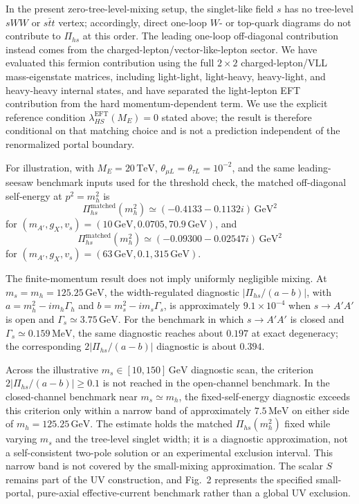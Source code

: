 \documentclass[12pt,a4paper]{article}
\begin{document}
In the present zero-tree-level-mixing setup, the singlet-like field \(s\) has no tree-level \(sWW\) or \(s\bar t t\) vertex; accordingly, direct one-loop \(W\)- or top-quark diagrams do not contribute to \(\Pi_{hs}\) at this order. The leading one-loop off-diagonal contribution instead comes from the charged-lepton/vector-like-lepton sector. We have evaluated this fermion contribution using the full \(2\times2\) charged-lepton/VLL mass-eigenstate matrices, including light-light, light-heavy, heavy-light, and heavy-heavy internal states, and have separated the light-lepton EFT contribution from the hard momentum-dependent term. We use the explicit reference condition \(\lambda_{HS}^{\mathrm{EFT}}(M_E)=0\) stated above; the result is therefore conditional on that matching choice and is not a prediction independent of the renormalized portal boundary.

For illustration, with \(M_E=20\,\mathrm{TeV}\), \(\theta_{\mu L}=\theta_{\tau L}=10^{-2}\), and the same leading-seesaw benchmark inputs used for the threshold check, the matched off-diagonal self-energy at \(p^2=m_h^2\) is
\[
\Pi_{hs}^{\mathrm{matched}}(m_h^2)
\simeq(-0.4133-0.1132i)\,\mathrm{GeV}^2
\]
for \((m_{A'},g_X,v_s)=(10\,\mathrm{GeV},0.0705,70.9\,\mathrm{GeV})\), and
\[
\Pi_{hs}^{\mathrm{matched}}(m_h^2)
\simeq(-0.09300-0.02547i)\,\mathrm{GeV}^2
\]
for \((m_{A'},g_X,v_s)=(63\,\mathrm{GeV},0.1,315\,\mathrm{GeV})\). 

The finite-momentum result does not imply uniformly negligible mixing. At \(m_s=m_h=125.25\,\mathrm{GeV}\), the width-regulated diagnostic \(|\Pi_{hs}/(a-b)|\), with \(a=m_h^2-i m_h\Gamma_h\) and \(b=m_s^2-i m_s\Gamma_s\), is approximately \(9.1\times10^{-4}\) when \(s\to A'A'\) is open and \(\Gamma_s\simeq3.75\,\mathrm{GeV}\). For the benchmark in which \(s\to A'A'\) is closed and \(\Gamma_s\simeq0.159\,\mathrm{MeV}\), the same diagnostic reaches about \(0.197\) at exact degeneracy; the corresponding \(2|\Pi_{hs}/(a-b)|\) diagnostic is about \(0.394\). 

Across the illustrative \(m_s\in[10,150]\,\mathrm{GeV}\) diagnostic scan, the criterion \(2|\Pi_{hs}/(a-b)|\geq0.1\) is not reached in the open-channel benchmark. In the closed-channel benchmark near \(m_s\simeq m_h\), the fixed-self-energy diagnostic exceeds this criterion only within a narrow band of approximately \(7.5\,\mathrm{MeV}\) on either side of \(m_h=125.25\,\mathrm{GeV}\). The estimate holds the matched \(\Pi_{hs}(m_h^2)\) fixed while varying \(m_s\) and the tree-level singlet width; it is a diagnostic approximation, not a self-consistent two-pole solution or an experimental exclusion interval. This narrow band is not covered by the small-mixing approximation. The scalar \(S\) remains part of the UV construction, and Fig.~2 represents the specified small-portal, pure-axial effective-current benchmark rather than a global UV exclusion.
\end{document}
